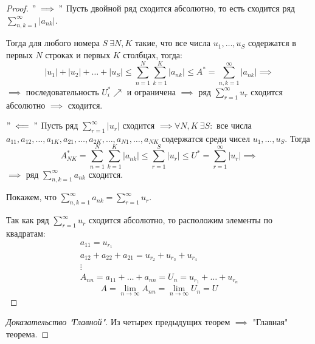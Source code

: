 \documentclass{report}
\theoremstyle{definition}
\begin{document}
\begin{proof}
  $"\implies"$ Пусть двойной ряд сходится абсолютно, то есть сходится ряд $\sum_{n,k=1}^{\infty}|a_{nk}|$.

  Тогда для любого номера $S \ \exists N,K$ такие, что все числа $u_1,\ldots,u_S$ содержатся в первых $N$ строках и первых $K$ столбцах, тогда:
  \begin{equation*}
    |u_1| + |u_2| + \ldots + |u_S| \leqslant \sum_{n=1}^{N}\sum_{k=1}^{K}|a_{nk}| \leqslant A^* = \sum_{n,k=1}^{\infty}|a_{nk}| \implies
  \end{equation*}
  $\implies$ последовательность $U_i^* \nearrow$ и ограничена $\implies$ ряд $\sum_{r=1}^{\infty}u_r$ сходится абсолютно $\implies$ сходится.

  $"\impliedby"$ Пусть ряд $\sum_{r=1}^{\infty}|u_r|$ сходится $\implies \forall N,K \ \exists S:$ все числа $a_{11},a_{12},\ldots,a_{1K},a_{21},\ldots,a_{2K},\ldots,a_{N1},\ldots,a_{NK}$ содержатся среди чисел $u_1,\ldots,u_S$. Тогда
  \begin{equation*}
    A_{NK}^* = \sum_{n=1}^{N}\sum_{k=1}^{K}|a_{nk}| \leqslant\sum_{r=1}^{S}|u_r| \leqslant U^* = \sum_{r=1}^{\infty}|u_r| \implies
  \end{equation*}
  $\implies$ ряд $\sum_{n,k=1}^{\infty}a_{nk}$ сходится.

  Покажем, что $\sum_{n,k=1}^{\infty}a_{nk} = \sum_{r=1}^{\infty}u_r$.

  Так как ряд $\sum_{r=1}^{\infty}u_r$ сходится абсолютно, то расположим элементы по квадратам:
  \begin{equation*}
    \begin{array}{l}
      a_{11} = u_{r_1}                                       \\
      a_{12} + a_{22} + a_{21} = u_{r_2} + u_{r_3} + u_{r_4} \\
      \vdots                                                 \\
      A_{nn} = a_{11} + \ldots + a_{nn} = U_n = u_{r_1} + \ldots + u_{r_n}
    \end{array}
  \end{equation*}
  \begin{equation*}
    A = \underset{n\rightarrow\infty}{\lim}A_{nn} = \underset{n\rightarrow\infty}{\lim}U_n = U
  \end{equation*}
\end{proof}

\begin{proof}[Доказательство "Главной"]
  Из четырех предыдущих теорем $\implies$ "Главная"  теорема.
\end{proof}
\end{document}
